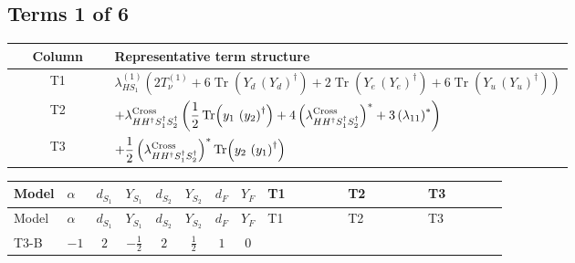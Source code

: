 \documentclass[8pt]{article}
\begin{document}
\begin{landscape}
\subsection*{Terms 1 of 6}
\begin{center}
\begin{tabular}{@{}c >{\raggedright\arraybackslash}p{0.82\linewidth}@{}}
\toprule
Column & Representative term structure \\
\midrule
T1 & \(\displaystyle {\lambda_{HS_1}^{(1)}} (2 T_{\nu}^{(1)}+6 \operatorname{Tr}\!\left({Y_d}\,\left({Y_d}\right)^{\dagger}\right)+2 \operatorname{Tr}\!\left({Y_e}\,\left({Y_e}\right)^{\dagger}\right)+6 \operatorname{Tr}\!\left({Y_u}\,\left({Y_u}\right)^{\dagger}\right))\) \\
\midrule
T2 & \(\displaystyle +{\lambda_{H H^\dagger S_1^\dagger S_2^\dagger}^{\rm Cross}} \left(\frac{1}{2} \operatorname{Tr}\!\left({y_1}\,\left({y_2}\right)^{\dagger}\right)+4 \left({\lambda_{H H^\dagger S_1^\dagger S_2^\dagger}^{\rm Cross}}\right)^{*}+3 \left({\lambda_{11}}\right)^{*}\right)\) \\
\midrule
T3 & \(\displaystyle +\frac{1}{2} \left({\lambda_{H H^\dagger S_1^\dagger S_2^\dagger}^{\rm Cross}}\right)^{*} \operatorname{Tr}\!\left({y_2}\,\left({y_1}\right)^{\dagger}\right)\) \\
\midrule
\bottomrule
\end{tabular}
\end{center}
\smallskip
\tiny
\begin{longtable}{@{}llcccccc >{\raggedright\arraybackslash}p{0.21\linewidth} >{\raggedright\arraybackslash}p{0.21\linewidth} >{\raggedright\arraybackslash}p{0.21\linewidth}@{}}
\toprule
Model & $\alpha$ & $d_{S_1}$ & $Y_{S_1}$ & $d_{S_2}$ & $Y_{S_2}$ & $d_F$ & $Y_F$ & T1 & T2 & T3 \\
\midrule
\endfirsthead
\toprule
Model & $\alpha$ & $d_{S_1}$ & $Y_{S_1}$ & $d_{S_2}$ & $Y_{S_2}$ & $d_F$ & $Y_F$ & T1 & T2 & T3 \\
\midrule
\endhead
T3-B & $-1$ & $2$ & $-\frac{1}{2}$ & $2$ & $\frac{1}{2}$ & $1$ & $0$ & \scriptsize\adjustbox{max width=\linewidth}{$\begin{gathered} {\lambda_{HS_1}^{(1)}} (2 T_{\nu}^{(1)}+6 \operatorname{Tr}\!\left({Y_d}\,\left({Y_d}\right)^{\dagger}\right)+2 \operatorname{Tr}\!\left({Y_e}\,\left({Y_e}\right)^{\dagger}\right)+6 \operatorname{Tr}\!\left({Y_u}\,\left({Y_u}\right)^{\dagger}\right))\end{gathered}$} & \scriptsize\adjustbox{max width=\linewidth}{$\begin{gathered} +{\lambda_{H H^\dagger S_1^\dagger S_2^\dagger}^{\rm Cross}} \left(\frac{1}{2} \operatorname{Tr}\!\left({y_1}\,\left({y_2}\right)^{\dagger}\right)+4 \left({\lambda_{H H^\dagger S_1^\dagger S_2^\dagger}^{\rm Cross}}\right)^{*}+3 \left({\lambda_{11}}\right)^{*}\right)\end{gathered}$} & \scriptsize\adjustbox{max width=\linewidth}{$\begin{gathered} +\frac{1}{2} \left({\lambda_{H H^\dagger S_1^\dagger S_2^\dagger}^{\rm Cross}}\right)^{*} \operatorname{Tr}\!\left({y_2}\,\left({y_1}\right)^{\dagger}\right)\end{gathered}$} \\

\end{longtable}
\end{landscape}
\end{document}
